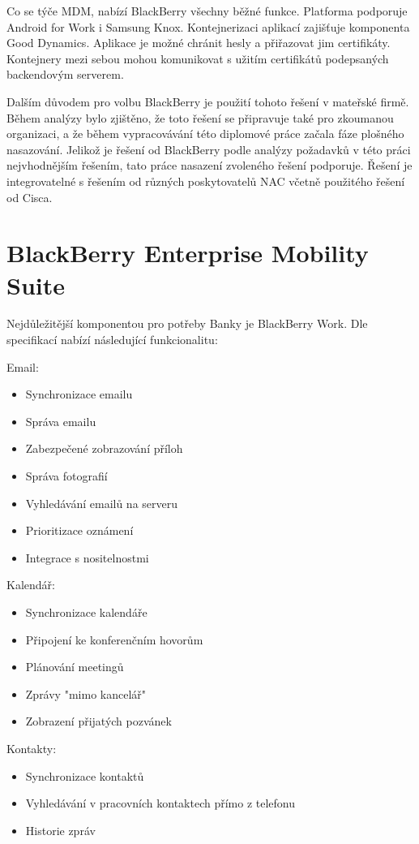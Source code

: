 Co se týče MDM, nabízí BlackBerry všechny běžné funkce. Platforma podporuje Android for Work i Samsung Knox. Kontejnerizaci aplikací zajišťuje komponenta Good Dynamics. Aplikace je možné chránit hesly a přiřazovat jim certifikáty. Kontejnery mezi sebou mohou komunikovat s užitím certifikátů podepsaných backendovým serverem. 


Dalším důvodem pro volbu BlackBerry je použití tohoto řešení v mateřské firmě. Během analýzy bylo zjištěno, že toto řešení se připravuje také pro zkoumanou organizaci, a že během vypracovávání této diplomové práce začala fáze plošného nasazování. Jelikož je řešení od BlackBerry podle analýzy požadavků v této práci nejvhodnějším řešením, tato práce nasazení zvoleného řešení podporuje. Řešení je integrovatelné s řešením od různých poskytovatelů NAC včetně použitého řešení od Cisca.    


\section{BlackBerry Enterprise Mobility Suite}

Nejdůležitější komponentou pro potřeby Banky je BlackBerry Work. Dle specifikací \cite{BBSpecs} nabízí následující funkcionalitu:

Email:
\begin{itemize}
    \item Synchronizace emailu
    \item Správa emailu
    \item Zabezpečené zobrazování příloh
    \item Správa fotografií
    \item Vyhledávání emailů na serveru
    \item Prioritizace oznámení
    \item Integrace s nositelnostmi
\end{itemize}

Kalendář:
\begin{itemize}
 \item Synchronizace kalendáře
 \item Připojení ke konferenčním hovorům
 \item Plánování meetingů
 \item Zprávy "mimo kancelář"
 \item Zobrazení přijatých pozvánek
\end{itemize}

Kontakty:
\begin{itemize}
   \item Synchronizace kontaktů
   \item Vyhledávání v pracovních kontaktech přímo z telefonu
   \item Historie zpráv
\end{itemize}

